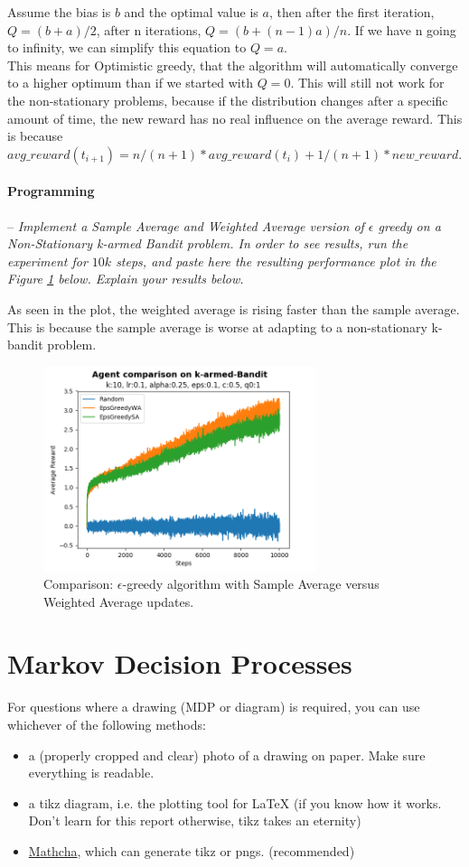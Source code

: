 \documentclass[a4paper]{article}
\newcommand{\programming}[1]{
\paragraph{Programming} -- \textit{#1}

}
\begin{document}
Assume the bias is $b$ and the optimal value is $a$, then after the first iteration, $Q = (b+a)/2$, after n iterations, $Q = (b + (n-1)a)/n$. If we have n going to infinity, we can simplify this equation to $Q = a$. \\


This means for Optimistic greedy, that the algorithm will automatically converge to a higher optimum than if we started with $Q=0$. This will still not work for the non-stationary problems, because if the distribution changes after a specific amount of time, the new reward has no real influence on the average reward. This is because $avg\_reward(t_{i+1}) = n/(n+1)*avg\_reward(t_i) + 1/(n+1)*new\_reward$.

\programming{Implement a Sample Average and Weighted Average version of $\epsilon$ greedy on a Non-Stationary k-armed Bandit problem. In order to see results, run the experiment for $10k$ steps, and paste here the resulting performance plot in the Figure \ref{fig:sa_vs_wa} below. Explain your results below.}
As seen in the plot, the weighted average is rising faster than the sample average. This is because the sample average is worse at adapting to a non-stationary k-bandit problem.
\begin{figure}[H]
    \centering
    \includegraphics[width=8cm]{plots/agent_comparison_perf.png}
    \caption{Comparison: $\epsilon$-greedy algorithm with Sample Average versus Weighted Average updates.}
    \label{fig:sa_vs_wa}
\end{figure}{}


\section{Markov Decision Processes}
For questions where a drawing (MDP or diagram) is required, you can use whichever of the following methods:
\begin{itemize}
    \item a (properly cropped and clear) photo of a drawing on paper. Make sure everything is readable.
    \item a tikz diagram, i.e. the plotting tool for LaTeX (if you know how it works. Don't learn for this report otherwise, tikz takes an eternity)
    \item \href{www.mathcha.io}{Mathcha}, which can generate tikz or pngs. (recommended)
\end{itemize}{}
\end{document}
